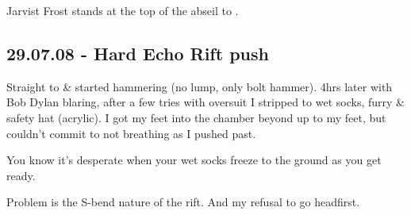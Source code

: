 \begin{pagefigure}
\checkoddpage \ifoddpage \forcerectofloat \else \forceversofloat \fi
\centering
{}
\caption{Jarvist Frost stands at the top of the abseil to \protect{}. }
\label{planika surface pitchead}
\end{pagefigure}

\clearpage

\subsection{29.07.08 - Hard Echo Rift push}


Straight to  \& started hammering (no lump, only bolt hammer).
4hrs later with Bob Dylan blaring, after a few tries with oversuit I
stripped to wet socks, furry \& safety hat (acrylic). I got my feet into
the chamber beyond up to my feet, but couldn't commit to not breathing
as I pushed past.

You know it's desperate when your wet socks freeze to the ground as you
get ready.

Problem is the S-bend nature of the rift. And my refusal to go
headfirst.

